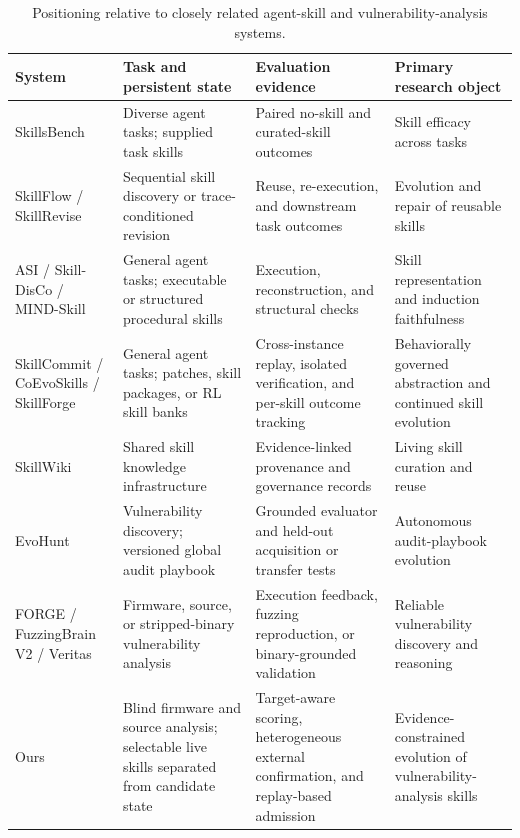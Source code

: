 \documentclass[11pt]{article}
\newcommand{\compacttable}{\footnotesize\setlength{\tabcolsep}{3.5pt}\renewcommand{\arraystretch}{1.08}}
\newcommand{\thead}[1]{\textbf{#1}}
\begin{document}
\begin{table}[t]
\centering
\caption{Positioning relative to closely related agent-skill and vulnerability-analysis systems.}
\label{tab:related_comparison}
\compacttable
\begin{tabularx}{\textwidth}{L{0.18\textwidth} L{0.24\textwidth} L{0.25\textwidth} Y}
\toprule
\thead{System} & \thead{Task and persistent state} & \thead{Evaluation evidence} & \thead{Primary research object} \\
\midrule
SkillsBench~\cite{skillsbench} & Diverse agent tasks; supplied task skills & Paired no-skill and curated-skill outcomes & Skill efficacy across tasks \\
SkillFlow / SkillRevise~\cite{skillflow,skillrevise} & Sequential skill discovery or trace-conditioned revision & Reuse, re-execution, and downstream task outcomes & Evolution and repair of reusable skills \\
ASI / Skill-DisCo / MIND-Skill~\cite{asi,skilldisco,mindskill} & General agent tasks; executable or structured procedural skills & Execution, reconstruction, and structural checks & Skill representation and induction faithfulness \\
SkillCommit / CoEvoSkills / SkillForge~\cite{skillcommit,coevoskills,skillforge} & General agent tasks; patches, skill packages, or RL skill banks & Cross-instance replay, isolated verification, and per-skill outcome tracking & Behaviorally governed abstraction and continued skill evolution \\
SkillWiki~\cite{skillwiki} & Shared skill knowledge infrastructure & Evidence-linked provenance and governance records & Living skill curation and reuse \\
EvoHunt~\cite{evohunt} & Vulnerability discovery; versioned global audit playbook & Grounded evaluator and held-out acquisition or transfer tests & Autonomous audit-playbook evolution \\
FORGE / FuzzingBrain V2 / Veritas~\cite{forge,fuzzingbrainv2,veritas} & Firmware, source, or stripped-binary vulnerability analysis & Execution feedback, fuzzing reproduction, or binary-grounded validation & Reliable vulnerability discovery and reasoning \\
Ours & Blind firmware and source analysis; selectable live skills separated from candidate state & Target-aware scoring, heterogeneous external confirmation, and replay-based admission & Evidence-constrained evolution of vulnerability-analysis skills \\
\bottomrule
\end{tabularx}
\end{table}
\end{document}
